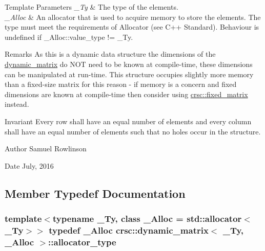 \begin{DoxyTemplParams}{Template Parameters}
{\em \+\_\+\+Ty} & The type of the elements. \\
\hline
{\em \+\_\+\+Alloc} & An allocator that is used to acquire memory to store the elements. The type must meet the requirements of {\ttfamily Allocator} (see C++ Standard). Behaviour is undefined if {\ttfamily \+\_\+\+Alloc\+::value\+\_\+type != \+\_\+\+Ty}. \\
\hline
\end{DoxyTemplParams}
\begin{DoxyRemark}{Remarks}
As this is a dynamic data structure the dimensions of the {\ttfamily \hyperlink{classcrsc_1_1dynamic__matrix}{dynamic\+\_\+matrix}} do N\+OT need to be known at compile-\/time, these dimensions can be manipulated at run-\/time. This structure occupies slightly more memory than a fixed-\/size matrix for this reason -\/ if memory is a concern and fixed dimensions are known at compile-\/time then consider using \hyperlink{classcrsc_1_1fixed__matrix}{crsc\+::fixed\+\_\+matrix} instead. 
\end{DoxyRemark}
\begin{DoxyInvariant}{Invariant}
Every row shall have an equal number of elements and every column shall have an equal number of elements such that no holes occur in the structure. 
\end{DoxyInvariant}
\begin{DoxyAuthor}{Author}
Samuel Rowlinson 
\end{DoxyAuthor}
\begin{DoxyDate}{Date}
July, 2016 
\end{DoxyDate}


\subsection{Member Typedef Documentation}
\subsubsection[{\texorpdfstring{allocator\+\_\+type}{allocator_type}}]{\setlength{\rightskip}{0pt plus 5cm}template$<$typename \+\_\+\+Ty, class \+\_\+\+Alloc = std\+::allocator$<$\+\_\+\+Ty$>$$>$ typedef \+\_\+\+Alloc {\bf crsc\+::dynamic\+\_\+matrix}$<$ \+\_\+\+Ty, \+\_\+\+Alloc $>$\+::{\bf allocator\+\_\+type}}\hypertarget{classcrsc_1_1dynamic__matrix_a730075d7fe9fd20dc909642546854572}{}\label{classcrsc_1_1dynamic__matrix_a730075d7fe9fd20dc909642546854572}
